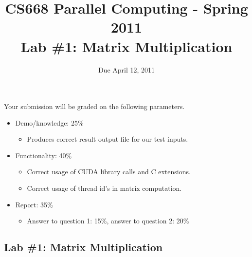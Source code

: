 \documentclass[12pt]{article}
\title{ CS668 Parallel Computing - Spring 2011 \\ Lab \#1: Matrix Multiplication}
\author{\MyFullName}
\date{Due April 12, 2011}
\begin{document}
\maketitle
\thispagestyle{empty}

Your submission will be graded on the following parameters.
\begin{itemize}
\item Demo/knowledge: 25\%
\begin{itemize}
\item Produces correct result output file for our test inputs.
\end{itemize}
\item Functionality:  40\%
\begin{itemize}
\item Correct usage of CUDA library calls and C extensions.
\item Correct usage of thread id's in matrix computation.
\end{itemize}
\item Report: 35\%
\begin{itemize}
\item Answer to question 1: 15\%, answer to question 2: 20\%
\end{itemize}
\end{itemize}

\setcounter{page}{0}
\newpage

\subsection{Lab \#1: Matrix Multiplication}
\end{document}
